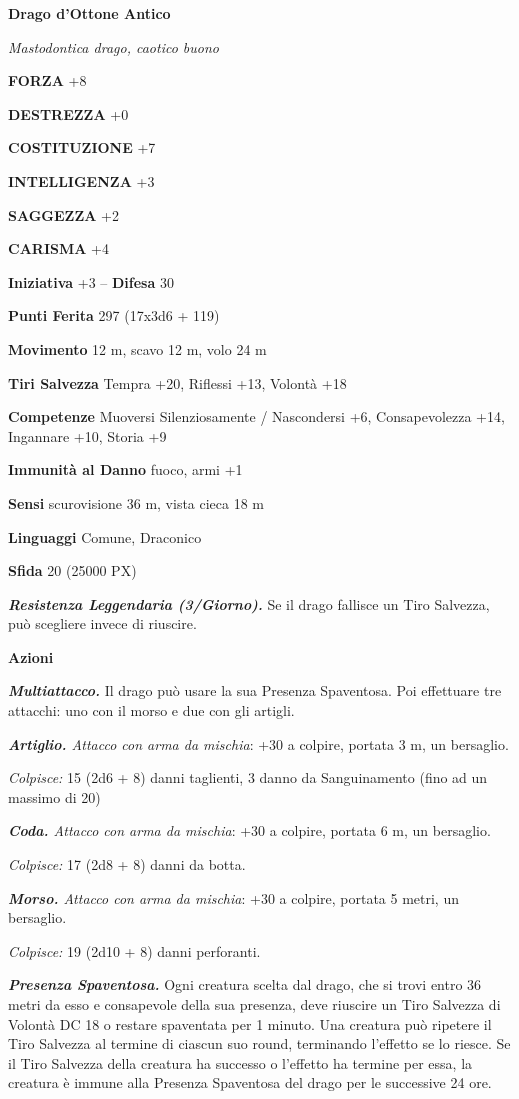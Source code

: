 \begin{multicols}{2}
\medskip{}\textbf{Drago d'Ottone Antico}

\textit{Mastodontica drago, caotico buono}

\textbf{FORZA} +8

\textbf{DESTREZZA} +0

\textbf{COSTITUZIONE} +7

\textbf{INTELLIGENZA} +3

\textbf{SAGGEZZA} +2

\textbf{CARISMA} +4

\textbf{Iniziativa} +3 -- \textbf{Difesa} 30

\textbf{Punti Ferita} 297 (17x3d6 + 119)

\textbf{Movimento} 12 m, scavo 12 m, volo 24 m

\textbf{Tiri Salvezza} Tempra +20, Riflessi +13, Volontà +18

\textbf{Competenze} Muoversi Silenziosamente / Nascondersi +6, Consapevolezza +14, Ingannare +10, Storia +9

\textbf{Immunità al Danno} fuoco, armi +1

\textbf{Sensi} scurovisione 36 m, vista cieca 18 m

\textbf{Linguaggi} Comune, Draconico

\textbf{Sfida} 20 (25000 PX)

\textit{\textbf{Resistenza Leggendaria (3/Giorno).}} Se il drago fallisce un Tiro Salvezza, può scegliere invece di riuscire.

\textbf{Azioni}

\textit{\textbf{Multiattacco.}} Il drago può usare la sua Presenza Spaventosa. Poi effettuare tre attacchi: uno con il morso e due con gli artigli.

\textit{\textbf{Artiglio.} Attacco con arma da mischia}: +30 a colpire, portata 3 m, un bersaglio.

\textit{Colpisce:} 15 (2d6 + 8) danni taglienti, 3 danno da Sanguinamento (fino ad un massimo di 20)

\textit{\textbf{Coda.} Attacco con arma da mischia}: +30 a colpire, portata 6 m, un bersaglio.

\textit{Colpisce:} 17 (2d8 + 8) danni da botta.

\textit{\textbf{Morso.} Attacco con arma da mischia}: +30 a colpire, portata 5 metri, un bersaglio.

\textit{Colpisce:} 19 (2d10 + 8) danni perforanti.

\textit{\textbf{Presenza Spaventosa.}} Ogni creatura scelta dal drago, che si trovi entro 36 metri da esso e consapevole della sua presenza, deve riuscire un Tiro Salvezza di Volontà DC 18 o restare spaventata per 1 minuto. Una creatura può ripetere il Tiro Salvezza al termine di ciascun suo round, terminando l'effetto se lo riesce. Se il Tiro Salvezza della creatura ha successo o l'effetto ha termine per essa, la creatura è immune alla Presenza Spaventosa del drago per le successive 24 ore.


\end{multicols}
